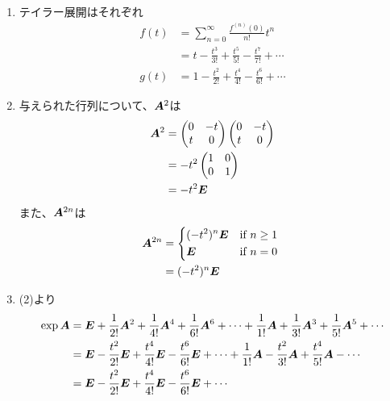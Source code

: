 \begin{ans*}
  ${}$
  \begin{enumerate}[label=(\arabic*)]
    \item テイラー展開はそれぞれ
    \begin{align}
      f(t) 
      &= \sum_{n=0}^{\infty} \frac{f^{(n)}(0)}{n!} t^n \\
      &= t - \frac{t^3}{3!} + \frac{t^5}{5!} - \frac{t^7}{7!} + \cdots \\
      g(t)
      &= 1 - \frac{t^2}{2!} + \frac{t^4}{4!} - \frac{t^6}{6!} + \cdots
    \end{align}
    \item 与えられた行列について、$\bm{A}^2$は
    \begin{align}
      \bm{A}^2
      &=
      \begin{pmatrix}
        0 & -t \\
        t & 0 
      \end{pmatrix}
      \begin{pmatrix}
        0 & -t \\
        t & 0
      \end{pmatrix} \\
      &= -t^2
      \begin{pmatrix}
        1 & 0 \\
        0 & 1
      \end{pmatrix} \\
      &= -t^2 \bm{E}
    \end{align}
    また、$\bm{A}^{2n}$は
    \begin{align}
      \bA^{2n}
      &=
      \begin{dcases*}
        (-t^{2})^{n}\bE & if $n\geq 1$ \\
        \bE & if $n = 0$
      \end{dcases*} \\
      &= (-t^{2})^{n}\bE    
    \end{align}
    \item (2)より
    \begin{align}
      \exp\bA
      &= 
      \bE + \frac{1}{2!}\bA^2 + \frac{1}{4!}\bA^4 + \frac{1}{6!}\bA^6 + \cdots 
      + \frac{1}{1!}\bA + \frac{1}{3!}\bA^3 + \frac{1}{5!}\bA^5 + \cdots \\
      &= 
      \bE - \frac{t^2}{2!}\bE + \frac{t^4}{4!}\bE - \frac{t^6}{6!}\bE + \cdots 
      + \frac{1}{1!}\bA - \frac{t^2}{3!}\bA + \frac{t^4}{5!}\bA - \cdots \\
      &=
      \bE - \frac{t^2}{2!}\bE + \frac{t^4}{4!}\bE - \frac{t^6}{6!}\bE + \cdots 

\end{align}
\end{enumerate}
\end{ans*}
